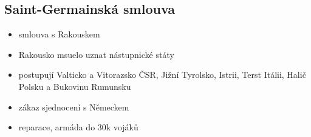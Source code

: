 \documentclass{article}
\begin{document}
\subsection{Saint-Germainská smlouva }
\begin{itemize}
  \item smlouva s Rakouskem
  \item Rakousko msuelo uznat nástupnické státy
  \item postupují Valticko a Vitorazsko ČSR, Jižní Tyrolsko, Istrii, Terst Itálii, Halič Polsku a Bukovinu Rumunsku
  \item zákaz sjednocení s Německem
  \item reparace, armáda do 30k vojáků
\end{itemize}
\end{document}
